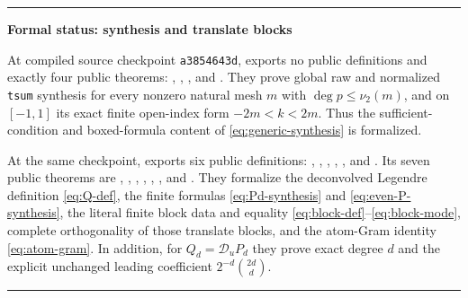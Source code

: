 \documentclass[11pt,oneside]{article}
\numberwithin{equation}{section}
\theoremstyle{definition}
\theoremstyle{remark}
\newenvironment{statusbox}[1]{%
  \par\smallskip\noindent\begin{center}\begin{minipage}{0.94\textwidth}%
  \hrule\vspace{0.55em}\noindent\textbf{#1}\par\smallskip
}{%
  \vspace{0.55em}\hrule\end{minipage}\end{center}\smallskip
}
\newcommand{\Dscr}{\mathscr D_u}
\begin{document}
\begin{statusbox}{Formal status: synthesis and translate blocks}
At compiled source checkpoint \texttt{a3854643d},
 exports no public definitions and
exactly four public theorems:
,
,
, and
.
They prove global raw and normalized \texttt{tsum} synthesis for every nonzero
natural mesh $m$ with \(\deg p\le\nu_2(m)\), and on $[-1,1]$ its exact finite
open-index form $-2m<k<2m$.  Thus the sufficient-condition and boxed-formula
content of \eqref{eq:generic-synthesis} is formalized.

At the same checkpoint,  exports six
public definitions: ,
, ,
,
, and .  Its seven
public theorems are
,
,
,
,
,
, and
.  They formalize the
deconvolved Legendre definition \eqref{eq:Q-def}, the finite formulas
\eqref{eq:Pd-synthesis} and \eqref{eq:even-P-synthesis}, the literal finite
block data and equality \eqref{eq:block-def}--\eqref{eq:block-mode}, complete
orthogonality of those translate blocks, and the atom-Gram identity
\eqref{eq:atom-gram}.  In addition, for $Q_d=\Dscr P_d$ they prove exact
degree $d$ and the explicit unchanged leading coefficient
$2^{-d}\binom{2d}{d}$.

\end{statusbox}
\end{document}
